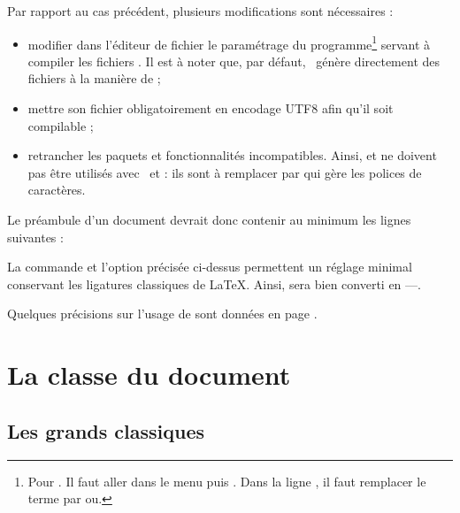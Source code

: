 Par rapport au cas précédent, plusieurs modifications sont nécessaires : 
\begin{itemize}
\item modifier dans l'éditeur de fichier  le paramétrage du programme\footnote{Pour . Il faut aller dans le menu  puis . Dans la ligne , il faut remplacer le terme  par  ou.} servant à compiler les fichiers . Il est à noter que, par défaut, \XeLaTeX\ génère directement des fichiers  à la manière de  ;
\item mettre son fichier obligatoirement en encodage UTF8 afin qu'il soit compilable ;
\item retrancher les paquets et fonctionnalités incompatibles. Ainsi,  et  ne doivent pas être utilisés avec \XeLaTeX\ et \LuaLaTeX: ils sont à remplacer par  qui gère les polices de caractères. \\
\end{itemize}

Le préambule d'un document devrait donc contenir au minimum les lignes suivantes : 


La commande  et l'option précisée ci-dessus permettent un réglage minimal conservant les ligatures classiques de \LaTeX. Ainsi, \macron{-{}-{}-} sera bien converti en ---. 

Quelques précisions sur l'usage de \XeLaTeX sont données en page \pageref{xelatex}.

\section{La classe du document}

\subsection{Les grands classiques}

